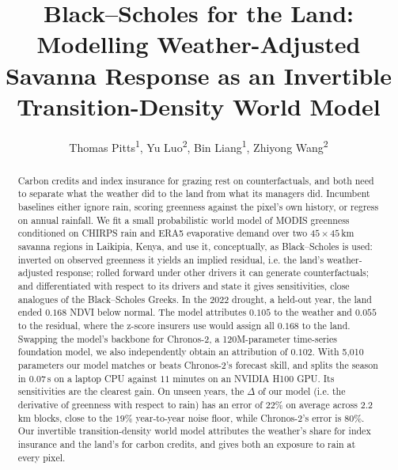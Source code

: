 \documentclass[letterpaper]{article} %
\title{Black--Scholes for the Land:\\ Modelling Weather-Adjusted Savanna Response as an Invertible Transition-Density World Model}
\author{
    Thomas Pitts\textsuperscript{\rm 1},
    Yu Luo\textsuperscript{\rm 2},
    Bin Liang\textsuperscript{\rm 1},
    Zhiyong Wang\textsuperscript{\rm 2}
}
\begin{document}
\maketitle

\begin{abstract}
Carbon credits and index insurance for grazing rest on counterfactuals, and both need to separate what the weather did to the land from what its managers did. Incumbent baselines either ignore rain, scoring greenness against the pixel's own history, or regress on annual rainfall. We fit a small probabilistic world model of MODIS greenness conditioned on CHIRPS rain and ERA5 evaporative demand over two $45\times45$\,km savanna regions in Laikipia, Kenya, and use it, conceptually, as Black--Scholes is used: inverted on observed greenness it yields an implied residual, i.e. the land's weather-adjusted response; rolled forward under other drivers it can generate counterfactuals; and differentiated with respect to its drivers and state it gives sensitivities, close analogues of the Black--Scholes Greeks. In the 2022 drought, a held-out year, the land ended $0.168$ NDVI below normal. The model attributes $0.105$ to the weather and $0.055$ to the residual, where the z-score insurers use would assign all $0.168$ to the land. Swapping the model's backbone for Chronos-2, a 120M-parameter time-series foundation model, we also independently obtain an attribution of $0.102$. With 5,010 parameters our model matches or beats Chronos-2's forecast skill, and splits the season in $0.07$\,s on a laptop CPU against $11$ minutes on an NVIDIA H100 GPU. Its sensitivities are the clearest gain. On unseen years, the $\Delta$ of our model (i.e. the derivative of greenness with respect to rain) has an error of $22\%$ on average across 2.2\,km blocks, close to the $19\%$ year-to-year noise floor, while Chronos-2's error is $80\%$. Our invertible transition-density world model attributes the weather's share for index insurance and the land's for carbon credits, and gives both an exposure to rain at every pixel.
\end{abstract}
\end{document}

